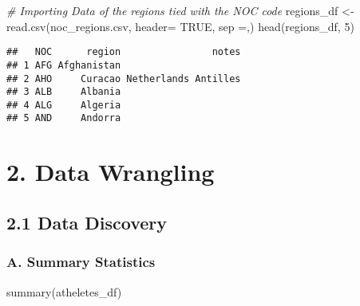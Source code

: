 \documentclass[
]{article}
\newenvironment{Shaded}{\begin{snugshade}}{\end{snugshade}}
\newcommand{\AttributeTok}[1]{\textcolor[rgb]{0.77,0.63,0.00}{#1}}
\newcommand{\CommentTok}[1]{\textcolor[rgb]{0.56,0.35,0.01}{\textit{#1}}}
\newcommand{\ConstantTok}[1]{\textcolor[rgb]{0.00,0.00,0.00}{#1}}
\newcommand{\DecValTok}[1]{\textcolor[rgb]{0.00,0.00,0.81}{#1}}
\newcommand{\FunctionTok}[1]{\textcolor[rgb]{0.00,0.00,0.00}{#1}}
\newcommand{\NormalTok}[1]{#1}
\newcommand{\OtherTok}[1]{\textcolor[rgb]{0.56,0.35,0.01}{#1}}
\newcommand{\StringTok}[1]{\textcolor[rgb]{0.31,0.60,0.02}{#1}}
\begin{document}
\begin{Shaded}
\begin{Highlighting}[]
\CommentTok{\# Importing Data of the regions tied with the NOC code}
\NormalTok{regions\_df }\OtherTok{\textless{}{-}} \FunctionTok{read.csv}\NormalTok{(}\StringTok{\textquotesingle{}noc\_regions.csv\textquotesingle{}}\NormalTok{, }\AttributeTok{header=} \ConstantTok{TRUE}\NormalTok{, }\AttributeTok{sep =}\StringTok{\textquotesingle{},\textquotesingle{}}\NormalTok{)}
\FunctionTok{head}\NormalTok{(regions\_df, }\DecValTok{5}\NormalTok{)}
\end{Highlighting}
\end{Shaded}

\begin{verbatim}
##   NOC      region                notes
## 1 AFG Afghanistan                     
## 2 AHO     Curacao Netherlands Antilles
## 3 ALB     Albania                     
## 4 ALG     Algeria                     
## 5 AND     Andorra
\end{verbatim}

\hypertarget{data-wrangling}{%
\section{2. Data Wrangling}\label{data-wrangling}}

\hypertarget{data-discovery}{%
\subsection{2.1 Data Discovery}\label{data-discovery}}

\hypertarget{a.-summary-statistics}{%
\subsubsection{A. Summary Statistics}\label{a.-summary-statistics}}

\begin{Shaded}
\begin{Highlighting}[]
\FunctionTok{summary}\NormalTok{(atheletes\_df)}
\end{Highlighting}
\end{Shaded}
\end{document}
